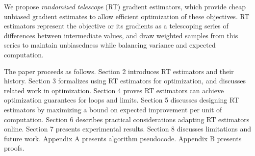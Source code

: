 We propose \emph{randomized telescope} (RT) gradient estimators, which provide cheap unbiased gradient estimates to allow efficient optimization of these objectives.
RT estimators represent the objective or its gradients as a telescoping series of differences between intermediate values, and draw weighted samples from this series to maintain unbiasedness while balancing variance and expected computation.

The paper proceeds as follows.
Section 2 introduces RT estimators and their history.
Section 3 formalizes using RT estimators for optimization, and discusses related work in optimization.
Section 4 proves RT estimators can achieve optimization guarantees for loops and limits.
Section 5 discusses designing RT estimators by maximizing a bound on expected improvement per unit of computation.
Section 6 describes practical considerations adapting RT estimators online.
Section 7 presents experimental results.
Section 8 discusses limitations and future work.
Appendix A presents algorithm pseudocode.
Appendix B presents proofs.

